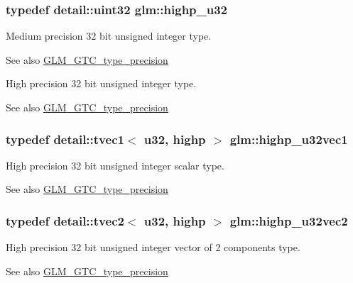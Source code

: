 \subsubsection[{\texorpdfstring{highp\+\_\+u32}{highp_u32}}]{\setlength{\rightskip}{0pt plus 5cm}typedef detail\+::uint32 {\bf glm\+::highp\+\_\+u32}}\hypertarget{group__gtc__type__precision_gae8e8a2c712653891a03c171795286ac5}{}\label{group__gtc__type__precision_gae8e8a2c712653891a03c171795286ac5}
Medium precision 32 bit unsigned integer type. \begin{DoxySeeAlso}{See also}
\hyperlink{group__gtc__type__precision}{G\+L\+M\+\_\+\+G\+T\+C\+\_\+type\+\_\+precision}
\end{DoxySeeAlso}
High precision 32 bit unsigned integer type. \begin{DoxySeeAlso}{See also}
\hyperlink{group__gtc__type__precision}{G\+L\+M\+\_\+\+G\+T\+C\+\_\+type\+\_\+precision} 
\end{DoxySeeAlso}
\subsubsection[{\texorpdfstring{highp\+\_\+u32vec1}{highp_u32vec1}}]{\setlength{\rightskip}{0pt plus 5cm}typedef detail\+::tvec1$<$ u32, highp $>$ {\bf glm\+::highp\+\_\+u32vec1}}\hypertarget{group__gtc__type__precision_ga8a92d1f79e2fd4a03be803e35aac8e1b}{}\label{group__gtc__type__precision_ga8a92d1f79e2fd4a03be803e35aac8e1b}
High precision 32 bit unsigned integer scalar type. \begin{DoxySeeAlso}{See also}
\hyperlink{group__gtc__type__precision}{G\+L\+M\+\_\+\+G\+T\+C\+\_\+type\+\_\+precision} 
\end{DoxySeeAlso}
\subsubsection[{\texorpdfstring{highp\+\_\+u32vec2}{highp_u32vec2}}]{\setlength{\rightskip}{0pt plus 5cm}typedef detail\+::tvec2$<$ u32, highp $>$ {\bf glm\+::highp\+\_\+u32vec2}}\hypertarget{group__gtc__type__precision_gaddb81e8e12bd640e188744ed372c95bb}{}\label{group__gtc__type__precision_gaddb81e8e12bd640e188744ed372c95bb}
High precision 32 bit unsigned integer vector of 2 components type. \begin{DoxySeeAlso}{See also}
\hyperlink{group__gtc__type__precision}{G\+L\+M\+\_\+\+G\+T\+C\+\_\+type\+\_\+precision} 
\end{DoxySeeAlso}
